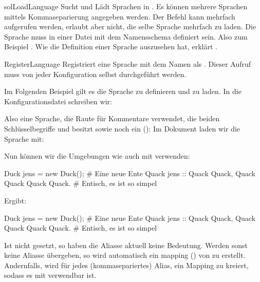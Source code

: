\documentclass{sopra-base}
\begin{document}
\begin{command}{solLoadLanguage}{}
    Sucht und Lädt Sprachen in . Es können mehrere Sprachen mittels Kommaseparierung angegeben werden. Der Befehl kann mehrfach aufgerufen werden, erlaubt aber nicht, die selbe Sprache mehrfach zu laden. Die Sprache muss in einer Datei mit dem Namensschema  definiert sein. Also zum Beispiel . Wie die Definition einer Sprache auszusehen hat, erklärt . 
\end{command}

\begin{command}{RegisterLanguage}{}
    Registriert eine Sprache mit dem Namen  als . Dieser Aufruf muss von jeder Konfiguration selbst durchgeführt werden. \par{}
    Im Folgenden Beispiel gilt es die Sprache  zu definieren und zu laden. In die Konfigurationsdatei schreiben wir:
\begin{latex}
\end{latex}
    Also eine Sprache, die Raute für Kommentare verwendet, die beiden Schlüsselbegriffe  und  besitzt sowie noch ein  (): 
    Im Dokument laden wir die Sprache mit:
\begin{latex}
\end{latex}
    Nun können wir die Umgebungen wie  auch mit  verwenden:
\begin{latex}[morekeywords={[3]{rubberduck}}]
\begin{rubberduck}
Duck jens = new Duck(); # Eine neue Ente
Quack jens ::{
    Quack Quack, Quack Quack
    Quack Quack. # Entisch, es ist so simpel
}
\end{rubberduck}
\end{latex}
Ergibt:
\begin{rubberduck}
Duck jens = new Duck(); # Eine neue Ente
Quack jens ::{
    Quack Quack, Quack Quack
    Quack Quack. # Entisch, es ist so simpel
}
\end{rubberduck}

    Ist  nicht gesetzt, so haben die Aliasse aktuell keine Bedeutung.
    Werden sonst keine Aliasse übergeben, so wird automatisch ein mapping () von  zu  erstellt. Andernfalls, wird für jedes (kommasepariertes) Alias, ein Mapping zu  kreiert, sodass es mit  verwendbar ist.
\end{command}
\end{document}
